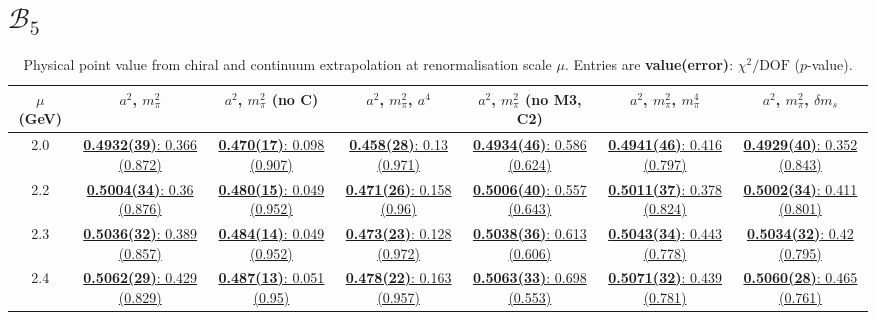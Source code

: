 \documentclass[12pt]{extarticle}
\begin{document}
\section{$\mathcal{B}_5$}
\begin{table}[h!]
\begin{center}
\begin{tabular}{|c|c|c|c|c|c|c|}
\hline
$\mu$ (GeV) & $a^2$, $m_\pi^2$& $a^2$, $m_\pi^2$ (no C)& $a^2$, $m_\pi^2$, $a^4$& $a^2$, $m_\pi^2$ (no M3, C2)& $a^2$, $m_\pi^2$, $m_\pi^4$& $a^2$, $m_\pi^2$, $\delta m_s$\\
\hline
2.0& \hyperlink{TT/SUSY/bag_a2m2_20.pdf.1}{\textbf{0.4932(39)}: 0.366 (0.872)} & \hyperlink{TT/SUSY/bag_a2m2noC_20.pdf.1}{\textbf{0.470(17)}: 0.098 (0.907)} & \hyperlink{TT/SUSY/bag_a2a4m2_20.pdf.1}{\textbf{0.458(28)}: 0.13 (0.971)} & \hyperlink{TT/SUSY/bag_a2m2mcut_20.pdf.1}{\textbf{0.4934(46)}: 0.586 (0.624)} & \hyperlink{TT/SUSY/bag_a2m2m4_20.pdf.1}{\textbf{0.4941(46)}: 0.416 (0.797)} & \hyperlink{TT/SUSY/bag_a2m2delm_20.pdf.1}{\textbf{0.4929(40)}: 0.352 (0.843)}\\
2.2& \hyperlink{TT/SUSY/bag_a2m2_22.pdf.1}{\textbf{0.5004(34)}: 0.36 (0.876)} & \hyperlink{TT/SUSY/bag_a2m2noC_22.pdf.1}{\textbf{0.480(15)}: 0.049 (0.952)} & \hyperlink{TT/SUSY/bag_a2a4m2_22.pdf.1}{\textbf{0.471(26)}: 0.158 (0.96)} & \hyperlink{TT/SUSY/bag_a2m2mcut_22.pdf.1}{\textbf{0.5006(40)}: 0.557 (0.643)} & \hyperlink{TT/SUSY/bag_a2m2m4_22.pdf.1}{\textbf{0.5011(37)}: 0.378 (0.824)} & \hyperlink{TT/SUSY/bag_a2m2delm_22.pdf.1}{\textbf{0.5002(34)}: 0.411 (0.801)}\\
2.3& \hyperlink{TT/SUSY/bag_a2m2_23.pdf.1}{\textbf{0.5036(32)}: 0.389 (0.857)} & \hyperlink{TT/SUSY/bag_a2m2noC_23.pdf.1}{\textbf{0.484(14)}: 0.049 (0.952)} & \hyperlink{TT/SUSY/bag_a2a4m2_23.pdf.1}{\textbf{0.473(23)}: 0.128 (0.972)} & \hyperlink{TT/SUSY/bag_a2m2mcut_23.pdf.1}{\textbf{0.5038(36)}: 0.613 (0.606)} & \hyperlink{TT/SUSY/bag_a2m2m4_23.pdf.1}{\textbf{0.5043(34)}: 0.443 (0.778)} & \hyperlink{TT/SUSY/bag_a2m2delm_23.pdf.1}{\textbf{0.5034(32)}: 0.42 (0.795)}\\
2.4& \hyperlink{TT/SUSY/bag_a2m2_24.pdf.1}{\textbf{0.5062(29)}: 0.429 (0.829)} & \hyperlink{TT/SUSY/bag_a2m2noC_24.pdf.1}{\textbf{0.487(13)}: 0.051 (0.95)} & \hyperlink{TT/SUSY/bag_a2a4m2_24.pdf.1}{\textbf{0.478(22)}: 0.163 (0.957)} & \hyperlink{TT/SUSY/bag_a2m2mcut_24.pdf.1}{\textbf{0.5063(33)}: 0.698 (0.553)} & \hyperlink{TT/SUSY/bag_a2m2m4_24.pdf.1}{\textbf{0.5071(32)}: 0.439 (0.781)} & \hyperlink{TT/SUSY/bag_a2m2delm_24.pdf.1}{\textbf{0.5060(28)}: 0.465 (0.761)}\\
\hline
\end{tabular}
\caption{Physical point value from chiral and continuum extrapolation at renormalisation scale $\mu$. Entries are \textbf{value(error)}: $\chi^2/\text{DOF}$ ($p$-value).}
\end{center}
\end{table}
\end{document}
